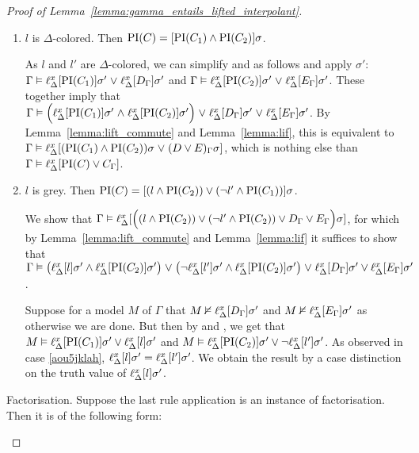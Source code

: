 \begin{proof}[Proof of Lemma~\ref{lemma:gamma_entails_lifted_interpolant}]
\begin{description}
\begin{enumerate}
				\item $l$ is $\Delta$-colored. Then $\operatorname{PI}(C) = [\operatorname{PI}(C_1) \land \operatorname{PI}(C_2)]\sigma$.

					As $l$ and $l'$ are $\Delta$-colored, we can simplify \markA{} and \markB{} as follows and apply $\sigma'$:
					$\Gamma \vDash \ell_{\Delta}^{x}[\operatorname{PI}(C_1)]\sigma' \;{\lor}\; \ell_{\Delta}^{x}[D_\Gamma]\sigma' $ and $\Gamma \vDash \ell_{\Delta}^{x}[\operatorname{PI}(C_2)]\sigma' \;{\lor}\; \ell_{\Delta}^{x}[E_\Gamma]\sigma'$.
					These together imply that 
					$\Gamma \vDash \Big(\ell_{\Delta}^{x}[\operatorname{PI}(C_1)]\sigma' \;{\land}\; \ell_{\Delta}^{x}[\operatorname{PI}(C_2)]\sigma'\Big) \;{\lor}\;\allowbreak \ell_{\Delta}^{x}[D_\Gamma]\sigma' \;{\lor}\;\allowbreak \ell_{\Delta}^{x}[E_\Gamma]\sigma'$.
					By Lemma~\ref{lemma:lift_commute} and Lemma~\ref{lemma:lif}, this is equivalent to 
					$\Gamma \vDash \ell_{\Delta}^{x}[(\operatorname{PI}(C_1) \land \operatorname{PI}(C_2))\sigma \;{\lor}\; (D \lor E)_\Gamma\sigma]$, which is nothing else than
					$\Gamma \vDash \ell_{\Delta}^{x}[\operatorname{PI}(C) \lor C_\Gamma]$.

				\item $l$ is grey. Then $\operatorname{PI}(C) = [(l \land \operatorname{PI}(C_2) ) \lor (\lnot l' \land \operatorname{PI}(C_1))]\sigma$.

					We show that $\Gamma \vDash\allowbreak \ell_{\Delta}^{x}[ \Big((l \land \operatorname{PI}(C_2) ) \lor\allowbreak (\lnot l' \land \operatorname{PI}(C_2)) \lor D_\Gamma \lor E_\Gamma\Big)\sigma]$, for which by Lemma~\ref{lemma:lift_commute} and Lemma~\ref{lemma:lif} it suffices to show that 
					$\Gamma \vDash\allowbreak \big(\ell_{\Delta}^{x}[l]\sigma' \land \ell_{\Delta}^{x}[\operatorname{PI}(C_2)]\sigma'\big)\;{\lor}\;\allowbreak \big(\lnot \ell_{\Delta}^{x}[l']\sigma' \land \ell_{\Delta}^{x}[\operatorname{PI}(C_2)]\sigma'\big)\;{\lor}\;\allowbreak \ell_{\Delta}^{x}[D_\Gamma]\sigma' \lor \ell_{\Delta}^{x}[E_\Gamma]\sigma'$.

					Suppose for a model $M$ of $\Gamma$ that  $M \nvDash \ell_{\Delta}^{x}[D_\Gamma]\sigma'$ and $M\nvDash \ell_{\Delta}^{x}[E_\Gamma]\sigma'$ as otherwise we are done.
					But then by \markA{} and \markB{}, we get that 
					$M \vDash \ell_{\Delta}^{x}[\operatorname{PI}(C_1)]\sigma' \lor \ell_{\Delta}^{x}[l]\sigma'$ and
					$M \entails\nolinebreak \lifdelta{\PI(C_2)}\sigma' \lor \lnot\lifdelta{l'}\sigma'$.
					As observed in case \ref{aou5jklah}, $\ell_{\Delta}^{x}[l]\sigma' = \ell_{\Delta}^{x}[l']\sigma'$.
					We obtain the result by a case distinction on the truth value of $\ell_{\Delta}^{x}[l]\sigma'$.

			\end{enumerate}

		\item{Factorisation.}
			Suppose the last rule application is an instance of factorisation. Then it is of the following form:
			\begin{prooftree}
			\end{prooftree}


\end{description}
\end{proof}
